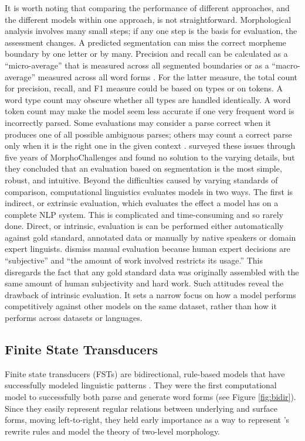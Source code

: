 \documentclass[12pt]{article}
\begin{document}
It is worth noting that comparing the performance of different approaches, and the different models within one approach, is not straightforward. Morphological analysis involves many small steps; if any one step is the basis for evaluation, the assessment changes. A predicted segmentation can miss the correct morpheme boundary by one letter or by many. Precision and recall can be calculated as a ``micro-average'' that is measured across all segmented boundaries or as a ``macro-average'' measured across all word forms \cite{ruokolainen_supervised_2013}. For the latter measure, the total count for precision, recall, and F1 measure could be based on types or on tokens. A word type count may obscure whether all types are handled identically. A word token count may make the model seem less accurate if one very frequent word is incorrectly parsed. Some evaluations may consider a parse correct when it produces one of all possible ambiguous parses; others may count a correct parse only when it is the right one in the given context \cite{ruokolainen_supervised_2013}.  surveyed these issues through five years of MorphoChallenges and found no solution to the varying details, but they concluded that an evaluation based on segmentation is the most simple, robust, and intuitive. Beyond the difficulties caused by varying standards of comparison, computational linguistics evaluates models in two ways. The first is indirect, or extrinsic evaluation, which evaluates the effect a model has on a complete NLP system. This is complicated and time-consuming and so rarely done. Direct, or intrinsic, evaluation is can be performed either automatically against gold standard, annotated data or manually by native speakers or domain expert linguists.  dismiss manual evaluation because human expert decisions are ``subjective'' and ``the amount of work involved restricts its usage.'' This disregards the fact that any gold standard data was originally assembled with the same amount of human subjectivity and hard work. Such attitudes reveal the drawback of intrinsic evaluation. It sets a narrow focus on how a model performs competitively against other models on the same dataset, rather than how it performs across datasets or languages. 

\subsection{Finite State Transducers}

Finite state transducers (FSTs) are bidirectional, rule-based models that have successfully modeled linguistic patterns \cite{koskenniemi_two-level_1983,beesley_finite-state_2003,hulden_finite-state_2009}. They were the first computational model to successfully both parse and generate word forms \cite{goodman_generation_2013} (see Figure \ref{fig:bidir}). Since they easily represent regular relations between underlying and surface forms, moving left-to-right, they held early importance as a way to represent 's  rewrite rules \cite{karttunen_2005} and model the theory of two-level morphology.
\bigskip
\end{document}
